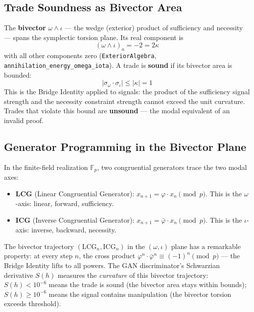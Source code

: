 \subsection{Trade Soundness as Bivector Area}

The \textbf{bivector} $\omega \wedge \iota$ --- the wedge (exterior) product of sufficiency and necessity --- spans the symplectic torsion plane. Its real component is
\begin{equation}
    (\omega \wedge \iota)_a = -2 = 2\kappa
\end{equation}
with all other components zero (\texttt{ExteriorAlgebra}, \texttt{annihilation\_energy\_omega\_iota}). A trade is \textbf{sound} if its bivector area is bounded:
\begin{equation}
    |\sigma_\omega \cdot \sigma_\iota| \leq |\kappa| = 1
\end{equation}
This is the Bridge Identity applied to signals: the product of the sufficiency signal strength and the necessity constraint strength cannot exceed the unit curvature. Trades that violate this bound are \textbf{unsound} --- the modal equivalent of an invalid proof.

\subsection{Generator Programming in the Bivector Plane}

In the finite-field realization $\mathbb{F}_p$, two congruential generators trace the two modal axes:
\begin{itemize}[noitemsep]
    \item \textbf{LCG} (Linear Congruential Generator): $x_{n+1} = \varphi \cdot x_n \pmod{p}$. This is the $\omega$-axis: linear, forward, sufficiency.
    \item \textbf{ICG} (Inverse Congruential Generator): $x_{n+1} = \bar\varphi \cdot x_n \pmod{p}$. This is the $\iota$-axis: inverse, backward, necessity.
\end{itemize}

The bivector trajectory $(\mathrm{LCG}_n, \mathrm{ICG}_n)$ in the $(\omega, \iota)$ plane has a remarkable property: at every step $n$, the cross product $\varphi^n \cdot \bar\varphi^n \equiv (-1)^n \pmod{p}$ --- the Bridge Identity lifts to all powers. The GAN discriminator's Schwarzian derivative $S(h)$ measures the \emph{curvature} of this bivector trajectory: $S(h) < 10^{-6}$ means the trade is sound (the bivector area stays within bounds); $S(h) \geq 10^{-6}$ means the signal contains manipulation (the bivector torsion exceeds threshold).

